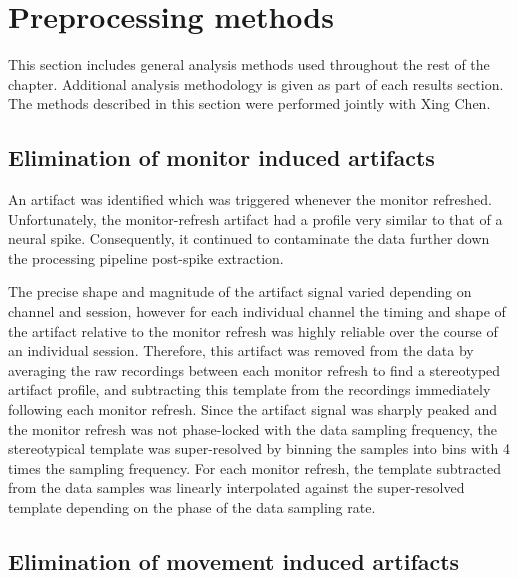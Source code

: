 \FloatBarrier
\section{Preprocessing methods}
\label{sec:pl_preprocessing}

This section includes general analysis methods used throughout the rest of the chapter.
Additional analysis methodology is given as part of each results section.
The methods described in this section were performed jointly with Xing Chen.


\subsection{Elimination of monitor induced artifacts}
\label{sec:pl_artifact_elimination}
\label{sec:ma}

An artifact was identified which was triggered whenever the monitor refreshed.
Unfortunately, the monitor-refresh artifact had a profile very similar to that of a neural spike.
Consequently, it continued to contaminate the data further down the processing pipeline post-spike extraction.

The precise shape and magnitude of the artifact signal varied depending on channel and session, however for each individual channel the timing and shape of the artifact relative to the monitor refresh was highly reliable over the course of an individual session.
Therefore, this artifact was removed from the data by averaging the raw recordings between each monitor refresh to find a stereotyped artifact profile, and subtracting this template from the recordings immediately following each monitor refresh.
Since the artifact signal was sharply peaked and the monitor refresh was not phase-locked with the data sampling frequency, the stereotypical template was super-resolved by binning the samples into bins with 4 times the sampling frequency.
For each monitor refresh, the template subtracted from the data samples was linearly interpolated against the super-resolved template depending on the phase of the data sampling rate.


\subsection{Elimination of movement induced artifacts}
\label{sec:pl_movement_artifact}

